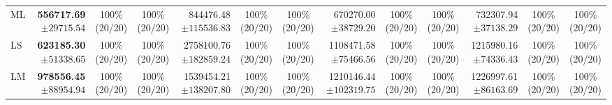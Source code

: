 \begin{table}[!t]
\begin{tabular}{@{}l*{4}{rcc}@{}}
ML & \shortstack[r]{\textbf{556717.69}\\$\pm 29715.54$} & \shortstack[c]{100\%\\(20/20)} & \shortstack[c]{100\%\\(20/20)} & \shortstack[r]{844476.48\\$\pm 115536.83$} & \shortstack[c]{100\%\\(20/20)} & \shortstack[c]{100\%\\(20/20)} & \shortstack[r]{670270.00\\$\pm 38729.20$} & \shortstack[c]{100\%\\(20/20)} & \shortstack[c]{100\%\\(20/20)} & \shortstack[r]{732307.94\\$\pm 37138.29$} & \shortstack[c]{100\%\\(20/20)} & \shortstack[c]{100\%\\(20/20)} \\
LS & \shortstack[r]{\textbf{623185.30}\\$\pm 51338.65$} & \shortstack[c]{100\%\\(20/20)} & \shortstack[c]{100\%\\(20/20)} & \shortstack[r]{2758100.76\\$\pm 182859.24$} & \shortstack[c]{100\%\\(20/20)} & \shortstack[c]{100\%\\(20/20)} & \shortstack[r]{1108471.58\\$\pm 75466.56$} & \shortstack[c]{100\%\\(20/20)} & \shortstack[c]{100\%\\(20/20)} & \shortstack[r]{1215980.16\\$\pm 74336.43$} & \shortstack[c]{100\%\\(20/20)} & \shortstack[c]{100\%\\(20/20)} \\
LM & \shortstack[r]{\textbf{978556.45}\\$\pm 88954.94$} & \shortstack[c]{100\%\\(20/20)} & \shortstack[c]{100\%\\(20/20)} & \shortstack[r]{1539454.21\\$\pm 138207.80$} & \shortstack[c]{100\%\\(20/20)} & \shortstack[c]{100\%\\(20/20)} & \shortstack[r]{1210146.44\\$\pm 102319.75$} & \shortstack[c]{100\%\\(20/20)} & \shortstack[c]{100\%\\(20/20)} & \shortstack[r]{1226997.61\\$\pm 86163.69$} & \shortstack[c]{100\%\\(20/20)} & \shortstack[c]{100\%\\(20/20)} \\

\end{tabular}
\end{table}
